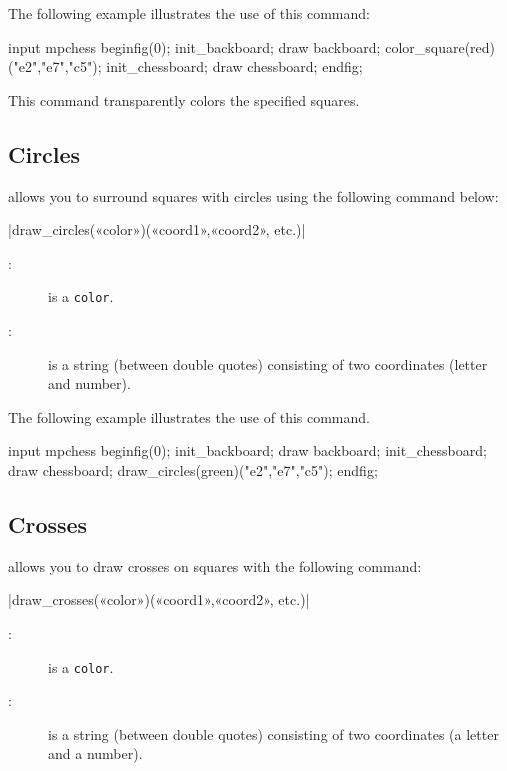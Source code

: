 \documentclass[english]{ltxdoc}
\begin{document}
The following example illustrates the use of this command:

\begin{ExempleMP}
input mpchess
beginfig(0);
init_backboard;
draw backboard;
color_square(red)("e2","e7","c5");
init_chessboard;
draw chessboard;
endfig;
\end{ExempleMP}

This command transparently colors the specified squares.

\subsection{Circles}

\mpchess allows you to surround squares with circles using the following command
 below:

\commande|draw_circles(«color»)(«coord1»,«coord2», etc.)|\smallskip

\begin{description}
\item[:] is a \MP{} \lstinline+color+.
\item[:] is a string (between double quotes) consisting of two
coordinates (letter and number). 
\end{description}

The following example illustrates the use of this command.

\begin{ExempleMP}
input mpchess
beginfig(0);
init_backboard;
draw backboard;
init_chessboard;
draw chessboard;
draw_circles(green)("e2","e7","c5");
endfig;
\end{ExempleMP}



\subsection{Crosses}


\mpchess allows you to draw crosses on squares with the following command:

\commande|draw_crosses(«color»)(«coord1»,«coord2», etc.)|\smallskip

\begin{description}
\item[:] is a \MP{} \lstinline+color+.
\item[:] is a string (between double quotes) consisting of two
coordinates (a letter and a number). 
\end{description}
\end{document}
